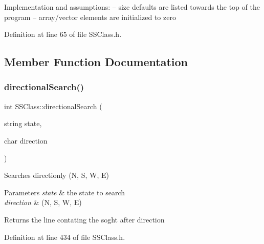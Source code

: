 Implementation and assumptions\+: -- size defaults are listed towards the top of the program -- array/vector elements are initialized to zero 

Definition at line 65 of file S\+S\+Class.\+h.



\subsection{Member Function Documentation}
\mbox{\label{classSSClass_ad03c99840c2946a2112f5f1942c287f2}} 
\subsubsection{\texorpdfstring{directional\+Search()}{directionalSearch()}}
{\footnotesize\ttfamily int S\+S\+Class\+::directional\+Search (\begin{DoxyParamCaption}\item[{string}]{state,  }\item[{char}]{direction }\end{DoxyParamCaption})}



Searches directionly (N, S, W, E) 


\begin{DoxyParams}{Parameters}
{\em state} & the state to search \\
\hline
{\em direction} & (N, S, W, E) \\
\hline
\end{DoxyParams}
\begin{DoxyReturn}{Returns}
the line contating the soght after direction 
\end{DoxyReturn}


Definition at line 434 of file S\+S\+Class.\+h.


